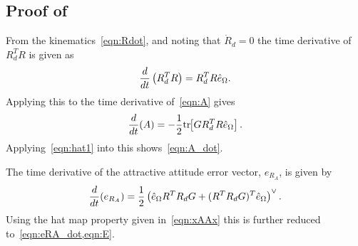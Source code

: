 


\subsection{Proof of~}\label{proof:attractive_error_dynamics}
From the kinematics~\cref{eqn:Rdot}, and noting that \( \dot{R}_d = 0 \) the time derivative of \( R_d^T R \) is given as
\begin{gather*}
	\frac{d }{d t} \left( R_d^T R \right) = R_d^T R \hat{e}_\Omega.
\end{gather*}
Applying this to the time derivative of~\cref{eqn:A} gives
\begin{gather*}
	\frac{d }{d t} (A) = -\frac{1}{2} \mathrm{tr}\negthickspace\left[ G R_d^T R \hat{e}_\Omega \right].
\end{gather*}
Applying~\cref{eqn:hat1} into this shows~\cref{eqn:A_dot}.

The time derivative of the attractive attitude error vector, \( e_{R_A} \), is given by
\begin{gather*}
	\frac{d }{d t} ( e_{R_A}) = \frac{1}{2} \left( \hat{e}_\Omega R^T R_d G + (R^T R_d G)^T \hat{e}_\Omega \right)^\vee.
\end{gather*}
Using the hat map property given in~\cref{eqn:xAAx} this is further reduced to~\cref{eqn:eRA_dot,eqn:E}.

